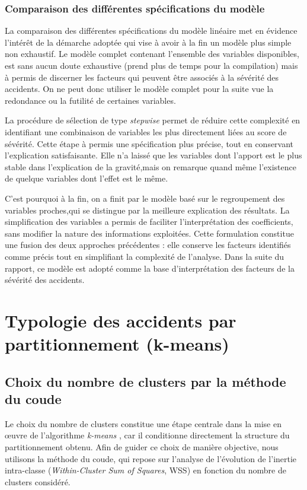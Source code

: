 \documentclass[11pt,a4paper]{article}
\begin{document}
\subsubsection{Comparaison des différentes spécifications du modèle}

La comparaison des différentes spécifications du modèle linéaire met en évidence l’intérêt de la démarche adoptée
qui vise à avoir à la fin un modèle plus simple non exhaustif.
Le modèle complet contenant l’ensemble des variables disponibles, est sans aucun doute exhaustive (prend plus de temps pour la compilation) mais à permis de discerner les facteurs qui peuvent être
associés à la sévérité des accidents. On ne peut donc utiliser le modèle complet pour la suite vue la redondance ou la futilité de certaines variables.

La procédure de sélection de type \textit{stepwise} permet de réduire cette complexité en identifiant une
combinaison de variables les plus directement liées au score de sévérité. Cette étape à permis une
spécification plus précise, tout en conservant l'explication satisfaisante. Elle n'a laissé que les variables dont l’apport est le plus stable dans l’explication de la gravité,mais on remarque quand même l'existence de quelque variables dont l'effet est le même.  

C'est pourquoi à la fin, on a finit par le modèle basé sur le regroupement des variables proches,qui se distingue par la meilleure explication
des résultats. La simplification des variables a permis de faciliter l’interprétation des
coefficients, sans modifier la nature des informations exploitées. Cette formulation constitue une
fusion des deux approches précédentes : elle conserve les facteurs identifiés comme précis
tout en simplifiant la complexité de l’analyse. Dans la suite du rapport, ce modèle est adopté comme la base
d’interprétation des facteurs de la sévérité des accidents.

\section{Typologie des accidents par partitionnement (k-means)}

\subsection{Choix du nombre de clusters par la méthode du coude}

Le choix du nombre de clusters constitue une étape centrale dans la mise en œuvre de l’algorithme
\textit{k-means} \citep{Kassambara2017}, car il conditionne directement la structure du partitionnement obtenu. Afin de guider ce
choix de manière objective, nous utilisons la méthode du coude, qui repose sur l’analyse de l’évolution
de l’inertie intra-classe (\textit{Within-Cluster Sum of Squares}, WSS) en fonction du nombre de clusters
considéré.
\end{document}
